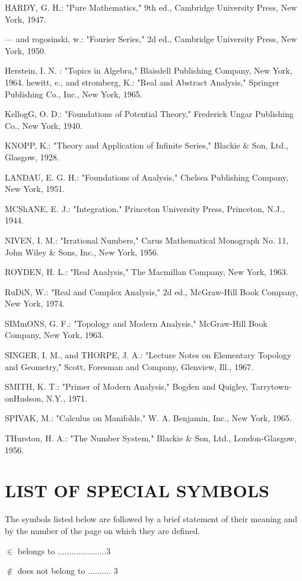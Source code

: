 \documentclass[10pt]{article}
\begin{document}
HARDY, G. H.: "Pure Mathematics," 9th ed., Cambridge University Press, New York, 1947.

— and rogosinski, w.: "Fourier Series," 2d ed., Cambridge University Press, New York, 1950.

Herstein, I. N. : "Topics in Algebra," Blaisdell Publishing Company, New York, 1964. hewitt, e., and stromberg, K.: "Real and Abstract Analysis," Springer Publishing Co., Inc., New York, 1965.

KellogG, O. D.: "Foundations of Potential Theory," Frederick Ungar Publishing Co., New York, 1940.

KNOPP, K.: "Theory and Application of Infinite Series," Blackie \& Son, Ltd., Glasgow, 1928.

LANDAU, E. G. H.: "Foundations of Analysis," Chelsea Publishing Company, New York, 1951.

MCShANE, E. J.: "Integration," Princeton University Press, Princeton, N.J., 1944.

NIVEN, I. M.: "Irrational Numbers," Carus Mathematical Monograph No. 11, John Wiley \& Sons, Inc., New York, 1956.

ROYDEN, H. L.: "Real Analysis," The Macmillan Company, New York, 1963.

RuDiN, W.: "Real and Complex Analysis," 2d ed., McGraw-Hill Book Company, New York, 1974.

SIMmONS, G. F.: "Topology and Modern Analysis," McGraw-Hill Book Company, New York, 1963.

SINGER, I. M., and THORPE, J. A.: "Lecture Notes on Elementary Topology and Geometry," Scott, Foresman and Company, Glenview, Ill., 1967.

SMITH, K. T.: "Primer of Modern Analysis," Bogden and Quigley, Tarrytown-onHudson, N.Y., 1971.

SPIVAK, M.: "Calculus on Manifolds," W. A. Benjamin, Inc., New York, 1965.

THurston, H. A.: "The Number System," Blackie \& Son, Ltd., London-Glasgow, 1956.

\section{LIST OF SPECIAL SYMBOLS}
The symbols listed below are followed by a brief statement of their meaning and by the number of the page on which they are defined.

$\in$ belongs to $\ldots \ldots \ldots \ldots \ldots \ldots \ldots 3$

$\notin$ does not belong to .......... 3
\end{document}
